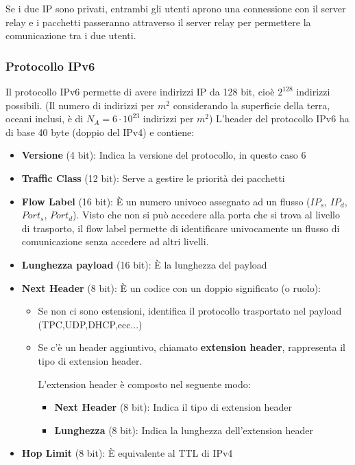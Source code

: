 \documentclass[a4paper]{article}
\begin{document}
\label{28-11-D2}
\noindent
Se i due IP sono privati, entrambi gli utenti aprono una connessione con il server relay
e i pacchetti passeranno attraverso il server relay per permettere la comunicazione tra
i due utenti.

\subsubsection{Protocollo IPv6}
Il protocollo IPv6 permette di avere indirizzi IP da 128 bit, cioè \( 2^{128} \) indirizzi
possibili. (Il numero di indirizzi per \( m^2 \) considerando la superficie della terra,
oceani inclusi, è di \( N_A = 6 \cdot 10^{23} \) indirizzi per \( m^2 \))
L'header del protocollo IPv6 ha di base 40 byte (doppio del IPv4) e contiene:
\label{28-11-D3}
\begin{itemize}
  \item \textbf{Versione} (4 bit): Indica la versione del protocollo, in questo caso 6
  \item \textbf{Traffic Class} (12 bit): Serve a gestire le priorità dei pacchetti
  \item \textbf{Flow Label} (16 bit): È un numero univoco assegnato ad un flusso 
    (\( IP_s \), \(IP_d\), \(Port_s\), \(Port_d \)). Visto che non si può accedere alla porta che si
    trova al livello di trasporto, il flow label permette di identificare univocamente
    un flusso di comunicazione senza accedere ad altri livelli.
  \item \textbf{Lunghezza payload} (16 bit): È la lunghezza del payload
  \item \textbf{Next Header} (8 bit): È un codice con un doppio significato (o ruolo):
    \begin{itemize}
      \item Se non ci sono estensioni, identifica il protocollo trasportato nel payload
        (TPC,UDP,DHCP,ecc...)
      \item Se c'è un header aggiuntivo, chiamato \textbf{extension header}, rappresenta
        il tipo di extension header.

        \noindent
        L'extension header è composto nel seguente modo:
        \label{28-11-D4}
        \begin{itemize}
          \item \textbf{Next Header} (8 bit): Indica il tipo di extension header
          \item \textbf{Lunghezza} (8 bit): Indica la lunghezza dell'extension header
        \end{itemize}
    \end{itemize}
  \item \textbf{Hop Limit} (8 bit): È equivalente al TTL di IPv4
\end{itemize}
\end{document}
